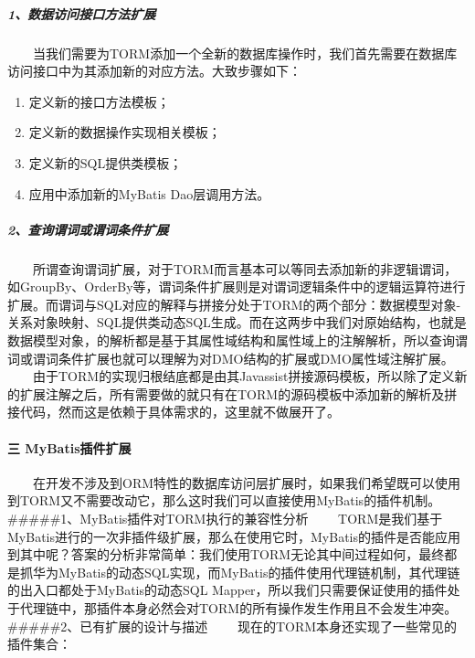 \documentclass[]{article}
\begin{document}
\subparagraph{1、数据访问接口方法扩展}\label{ux6570ux636eux8bbfux95eeux63a5ux53e3ux65b9ux6cd5ux6269ux5c55}

　　当我们需要为TORM添加一个全新的数据库操作时，我们首先需要在数据库访问接口中为其添加新的对应方法。大致步骤如下：

\begin{enumerate}
\def\labelenumi{\arabic{enumi}.}
\itemsep1pt\parskip0pt
\item
  定义新的接口方法模板；
\item
  定义新的数据操作实现相关模板；
\item
  定义新的SQL提供类模板；
\item
  应用中添加新的MyBatis Dao层调用方法。
\end{enumerate}

\subparagraph{2、查询谓词或谓词条件扩展}\label{ux67e5ux8be2ux8c13ux8bcdux6216ux8c13ux8bcdux6761ux4ef6ux6269ux5c55}

　　所谓查询谓词扩展，对于TORM而言基本可以等同去添加新的非逻辑谓词，如GroupBy、OrderBy等，谓词条件扩展则是对谓词逻辑条件中的逻辑运算符进行扩展。而谓词与SQL对应的解释与拼接分处于TORM的两个部分：数据模型对象-关系对象映射、SQL提供类动态SQL生成。而在这两步中我们对原始结构，也就是数据模型对象，的解析都是基于其属性域结构和属性域上的注解解析，所以查询谓词或谓词条件扩展也就可以理解为对DMO结构的扩展或DMO属性域注解扩展。
　　由于TORM的实现归根结底都是由其Javassist拼接源码模板，所以除了定义新的扩展注解之后，所有需要做的就只有在TORM的源码模板中添加新的解析及拼接代码，然而这是依赖于具体需求的，这里就不做展开了。

\paragraph{三
MyBatis插件扩展}\label{ux4e09-mybatisux63d2ux4ef6ux6269ux5c55}

　　在开发不涉及到ORM特性的数据库访问层扩展时，如果我们希望既可以使用到TORM又不需要改动它，那么这时我们可以直接使用MyBatis的插件机制。
\#\#\#\#\#1、MyBatis插件对TORM执行的兼容性分析
　　TORM是我们基于MyBatis进行的一次非插件级扩展，那么在使用它时，MyBatis的插件是否能应用到其中呢？答案的分析非常简单：我们使用TORM无论其中间过程如何，最终都是抓华为MyBatis的动态SQL实现，而MyBatis的插件使用代理链机制，其代理链的出入口都处于MyBatis的动态SQL
Mapper，所以我们只需要保证使用的插件处于代理链中，那插件本身必然会对TORM的所有操作发生作用且不会发生冲突。
\#\#\#\#\#2、已有扩展的设计与描述
　　现在的TORM本身还实现了一些常见的插件集合：
\end{document}
